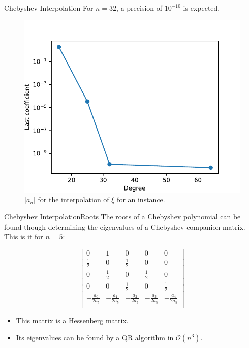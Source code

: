 \documentclass{beamer}
\newcommand{\bigO}{\mathscr{O}}
\begin{document}
\begin{frame}{Chebyshev Interpolation}
	For $n=32$, a precision of $10^{-10}$ is expected.
	
	\begin{figure}
		\centering
		
		\includegraphics[scale=.6]{error_coef}
		\caption{$|a_n|$ for the interpolation of $\xi$ for an instance.}
	\end{figure}
\end{frame}

\begin{frame}{Chebyshev Interpolation}{Roots}
	The roots of a Chebyshev polynomial can be found though determining the eigenvalues of a Chebyshev companion matrix. This is it for $n=5$:
	
	\begin{equation*}
	\left[\begin{array}{cccccc}
	0&1&0&0&0\\
	\frac{1}{2} & 0 & \frac{1}{2} & 0 & 0\\
	0 & \frac{1}{2} & 0 & \frac{1}{2} & 0\\
	0 & 0 & \frac{1}{2} & 0 & \frac{1}{2}\\
	-\frac{a_0}{2a_5} & -\frac{a_1}{2a_5} &-\frac{a_2}{2a_5} &-\frac{a_3}{2a_5} &-\frac{a_4}{2a_5}\\
	\end{array}\right]
	\end{equation*}
	
	\begin{itemize}
		\item This matrix is a Hessenberg matrix.
		\item Its eigenvalues can be found by a QR algorithm in $\bigO(n^3)$.
	\end{itemize}
\end{frame}
\end{document}
